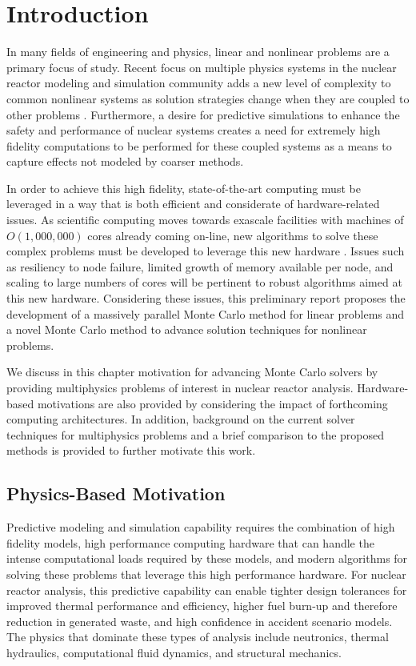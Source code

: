 \chapter{Introduction}
\label{ch:introduction}
In many fields of engineering and physics, linear and nonlinear
problems are a primary focus of study. Recent focus on multiple
physics systems in the nuclear reactor modeling and simulation
community adds a new level of complexity to common nonlinear systems
as solution strategies change when they are coupled to other problems
\citep{u.s._department_of_energy_casl_2011}. Furthermore, a desire
for predictive simulations to enhance the safety and performance of
nuclear systems creates a need for extremely high fidelity
computations to be performed for these coupled systems as a means to
capture effects not modeled by coarser methods.

In order to achieve this high fidelity, state-of-the-art computing
 must be leveraged in a way that is both efficient
and considerate of hardware-related issues. As scientific computing
moves towards exascale facilities with machines of $O(1,000,000)$
cores already coming on-line, new algorithms to solve these complex
problems must be developed to leverage this new hardware
\citep{kogge_using_2011}. Issues such as resiliency to node failure,
limited growth of memory available per node, and scaling to large
numbers of cores will be pertinent to robust algorithms aimed at this
new hardware. Considering these issues, this preliminary report
proposes the development of a massively parallel Monte Carlo method
for linear problems and a novel Monte Carlo method to advance solution
techniques for nonlinear problems.

We discuss in this chapter motivation for advancing Monte Carlo
solvers by providing multiphysics problems of interest in nuclear
reactor analysis. Hardware-based motivations are also provided by
considering the impact of forthcoming computing architectures. In
addition, background on the current solver techniques for multiphysics
problems and a brief comparison to the proposed methods is provided
to further motivate this work.

\section{Physics-Based Motivation}
\label{sec:physics_motivation}
Predictive modeling and simulation capability requires the combination
of high fidelity models, high performance computing hardware that can
handle the intense computational loads required by these models, and
modern algorithms for solving these problems that leverage this high
performance hardware. For nuclear reactor analysis, this predictive
capability can enable tighter design tolerances for improved thermal
performance and efficiency, higher fuel burn-up and therefore reduction
in generated waste, and high confidence in accident scenario
models. The physics that dominate these types of analysis include
neutronics, thermal hydraulics, computational fluid dynamics, and
structural mechanics.

